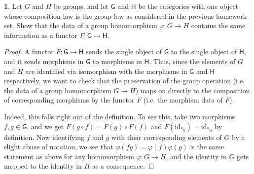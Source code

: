 \documentclass[12pt]{article}
\theoremstyle{definition}
\newtheorem{ex}{}
\begin{document}
\begin{ex}
	Let $G$ and $H$ be groups, and let $\mathsf{G}$ and $\mathsf{H}$ be the categories with one object whose composition law is the group law as considered in the previous homework set.
	Show that the data of a group homomorphism $\varphi : G \to H$ contains the same information as a functor $F: \mathsf{G} \to \mathsf{H}$.
\end{ex}
\begin{proof}
  A functor $F: \mathsf{G} \to \mathsf{H}$ sends the single object of $\mathsf{G}$ to the single object of $\mathsf{H}$, and it sends morphisms in $\mathsf{G}$ to morphisms in $\mathsf{H}$.
  Thus, since the elements of $G$ and $H$ are identified via isomorphism with the morphisms in $\mathsf{G}$ and $\mathsf{H}$ respectively, we want to check that the preservation of the group operation (i.e. the data of a group homomorphism $G \to H$) maps on directly to the composition of corresponding morphisms by the functor $F$ (i.e. the morphism data of $F$).

  Indeed, this falls right out of the definition.
  To see this, take two morphisms $f, g \in \mathsf{G}$, and we get $F(g \circ f) = F(g) \circ F(f)$ and $F(\mathrm{id}_{\ast_\mathsf{G}}) = \mathrm{id}_{\ast_\mathsf{H}}$ by definition.
  Now identifying $f$ and $g$ with their corresponding elements of $G$ by a slight abuse of notation, we see that $\varphi(fg) = \varphi(f)\varphi(g)$ is the same statement as above for any homomorphism $\varphi: G \to H$, and the identity in $G$ gets mapped to the identity in $H$ as a consequence.
\end{proof}
\end{document}
